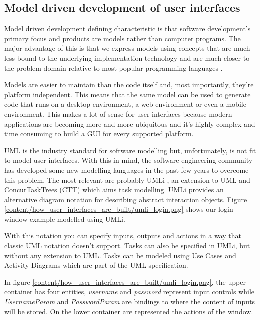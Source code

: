 \subsection{Model driven development of user interfaces}
Model driven development defining characteristic is that software development's primary focus and products are models rather than computer programs. The major advantage of this is that we express models using concepts that are much less bound to the underlying implementation technology and are much closer to the problem domain relative to most popular programming languages \cite{The_Pragmatics_of_Model-Driven_Development}.

Models are easier to maintain than the code itself and, most importantly, they're platform independent. This means that the same model can be used to generate code that runs on a desktop environment, a web environment or even a mobile environment. This makes a lot of sense for user interfaces because modern applications are becoming more and more ubiquitous and it's highly complex and time consuming to build a GUI for every supported platform.

UML \cite{The_Unified_Modeling_Language_Reference_Manual} is the industry standard for software modelling but, unfortunately, is not fit to model user interfaces. With this in mind, the software engineering community has developed some new modelling languages in the past few years to overcome this problem. The most relevant are probably UMLi \cite{User_Interface_Modeling_in_UMLi}, an extension to UML and ConcurTaskTrees (CTT) \cite{ConcurTaskTrees_A_Diagrammatic_Notation_for_Specifying_Task_Models} which aims task modelling. UMLi provides an alternative diagram notation for describing abstract interaction objects. Figure \ref{content/how_user_interfaces_are_built/umli_login.png} shows our login window example modelled using UMLi.

With this notation you can specify inputs, outputs and actions in a way that classic UML notation doesn’t support. Tasks can also be specified in UMLi, but without any extension to UML. Tasks can be modeled using Use Cases and Activity Diagrams which are part of the UML specification.

In figure \ref{content/how_user_interfaces_are_built/umli_login.png}, the upper container has four entities, \textit{username} and \textit{password} represent input controls while \textit{UsernameParam} and \textit{PasswordParam} are bindings to where the content of inputs will be stored. On the lower container are represented the actions of the window.

